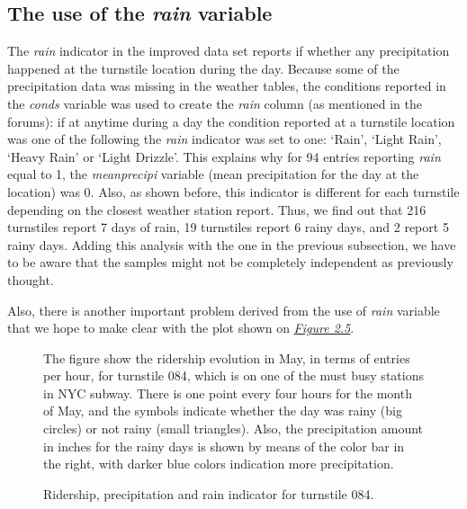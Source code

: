 \documentclass[letterpaper,10pt,english]{sphinxmanual}
\begin{document}
\subsection{The use of the \emph{rain} variable}
\label{section1:the-use-of-the-rain-variable}
The \emph{rain} indicator in the improved data set reports if whether any precipitation
happened at the turnstile location during the day. Because some of the
precipitation data was missing in the weather tables, the conditions
reported in the \emph{conds} variable was used to create the \emph{rain} column (as
mentioned in the forums): if at anytime during a day the condition reported at
a turnstile location was one of the following the \emph{rain} indicator was set to one:
`Rain', `Light Rain', `Heavy Rain' or `Light Drizzle'. This explains why for 94
entries reporting \emph{rain} equal to 1, the \emph{meanprecipi} variable (mean precipitation
for the day at the location) was 0. Also, as shown before, this indicator is different
for each turnstile depending on the closest weather station report. Thus, we
find out that 216 turnstiles report 7 days of rain, 19 turnstiles report 6 rainy
days, and 2 report 5 rainy days. Adding this analysis with the one in the previous
subsection, we have to be aware that the samples might not be completely independent
as previously thought.

Also, there is another important problem derived from the use of \emph{rain}
variable that we hope to make clear with the plot shown on
{\hyperref[section1:figure25]{\emph{Figure 2.5}}}.
\begin{figure}[htbp]
\centering
\capstart

\caption{Ridership, precipitation and rain indicator for turnstile 084.}{\small 
The figure show the ridership evolution in May, in terms of entries per hour,
for turnstile 084, which is on one of the must busy stations in NYC subway.
There is one point every four hours for the month of May, and the symbols indicate
whether the day was rainy (big circles) or not rainy (small triangles). Also,
the precipitation amount in inches for the rainy days is shown by means of the
color bar in the right, with darker blue colors indication more precipitation.
}\label{section1:figure25}\end{figure}
\end{document}
